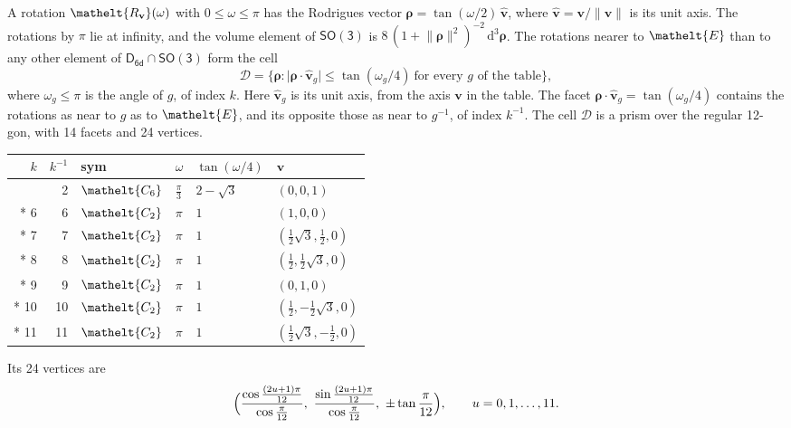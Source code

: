 \documentclass[10pt,a4paper]{article}
\numberwithin{equation}{section}
\newcommand{\eltfont}[1]{{\let\sigma\eltsigma\mathelt{#1}}}
\newcommand{\grp}[1]{\mathsf{#1}}
\newcommand{\cls}[1]{\eltfont{#1}}
\newcommand{\elt}[1]{\eltfont{#1}}
\newcommand{\dirvec}[3]{(#1, #2, #3)}
\newcommand{\unitaxis}{\hat{\mathbf{v}}}
\newcommand{\vv}{\mathbf{v}}
\newcommand{\diff}{\mathrm{d}}
\newcommand{\rodrigues}{\boldsymbol{\rho}}
\newcommand{\fcell}{\mathcal{D}}
\begin{document}
\leavevmode\label{n:vector.rodrigues}\label{n:vector.unitaxis}A rotation $\elt{R_{\vv}}(\omega)$ with $0 \le \omega \le \pi$ has the Rodrigues vector $\rodrigues = \tan(\omega/2)\,\unitaxis$, where $\unitaxis = \vv/\lVert\vv\rVert$ is its unit axis. The rotations by $\pi$ lie at infinity, and the volume element of \href{SO3.pdf}{$\grp{SO(3)}$} is $8\,(1 + \lVert\rodrigues\rVert^2)^{-2}\,\diff^3\rodrigues$.
\leavevmode\label{n:set.cell}The rotations nearer to $\elt{E}$ than to any other element of $\grp{D_{6d}} \cap \grp{SO(3)}$ form the cell
\begin{equation}\label{e:cell}\fcell = \bigl\{\rodrigues : \lvert\rodrigues\cdot\unitaxis_g\rvert \le \tan(\omega_g/4)\ \text{for every $g$ of the table}\bigr\},\end{equation}
where $\omega_g \le \pi$ is the angle of $g$, of index $k$. Here $\unitaxis_g$ is its unit axis, from the axis $\vv$ in the table. The facet $\rodrigues\cdot\unitaxis_g = \tan(\omega_g/4)$ contains the rotations as near to $g$ as to $\elt{E}$, and its opposite those as near to $g^{-1}$, of index $k^{-1}$. The cell $\fcell$ is a prism over the regular 12-gon, with 14 facets and 24 vertices.
{\small{\renewcommand{\arraystretch}{1.3}\begin{longtable}{@{}rrllll@{}}\toprule
$k$ & $k^{-1}$ & sym & $\omega$ & $\tan(\omega/4)$ & $\vv$\\\midrule\endhead
\bottomrule\endfoot\endlastfoot
1 & 2 & $\cls{C_{6}}$ & $\tfrac{\pi}{3}$ & $2 - \sqrt{3}$ & $\dirvec{0}{0}{1}$\\*
6 & 6 & $\cls{C_{2}}$ & $\pi$ & $1$ & $\dirvec{1}{0}{0}$\\*
7 & 7 & $\cls{C_{2}}$ & $\pi$ & $1$ & $\dirvec{\tfrac{1}{2}\sqrt{3}}{\tfrac{1}{2}}{0}$\\*
8 & 8 & $\cls{C_{2}}$ & $\pi$ & $1$ & $\dirvec{\tfrac{1}{2}}{\tfrac{1}{2}\sqrt{3}}{0}$\\*
9 & 9 & $\cls{C_{2}}$ & $\pi$ & $1$ & $\dirvec{0}{1}{0}$\\*
10 & 10 & $\cls{C_{2}}$ & $\pi$ & $1$ & $\dirvec{\tfrac{1}{2}}{-\tfrac{1}{2}\sqrt{3}}{0}$\\*
11 & 11 & $\cls{C_{2}}$ & $\pi$ & $1$ & $\dirvec{\tfrac{1}{2}\sqrt{3}}{-\tfrac{1}{2}}{0}$\\
\bottomrule\end{longtable}}}
\leavevmode\label{n:local.vertex.u}Its 24 vertices are
\begin{equation}\label{e:prism}\Bigl(\frac{\cos\frac{(2u+1)\pi}{12}}{\cos\frac{\pi}{12}},\ \frac{\sin\frac{(2u+1)\pi}{12}}{\cos\frac{\pi}{12}},\ \pm\tan\frac{\pi}{12}\Bigr),\qquad u = 0, 1, \dots, 11.\end{equation}
\end{document}
